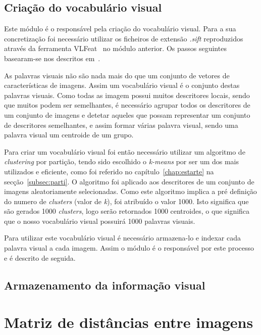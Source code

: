 \subsection{Criação do vocabulário visual}

Este módulo é o responsável pela criação do vocabulário visual. Para a sua concretização foi necessário utilizar os ficheiros de extensão \textit{.sift} reproduzidos através da ferramenta VLFeat~\cite{vedaldi08vlfeat} no módulo anterior. Os passos seguintes basearam-se nos descritos em~\cite{Solem2012}. 

As palavras visuais não são nada mais do que um conjunto de vetores de características de imagens. Assim um vocabulário visual é o conjunto destas palavras visuais. Como todas as imagem possui muitos descritores locais, sendo que muitos podem ser semelhantes, é necessário agrupar todos os descritores de um conjunto de imagens e detetar aqueles que possam representar um conjunto de descritores semelhantes, e assim formar várias palavra visual, sendo uma palavra visual um centroide de um grupo.

Para criar um vocabulário visual foi então necessário utilizar um algoritmo de \textit{clustering} por partição, tendo sido escolhido o \textit{k-means} por ser um dos mais utilizados e eficiente, como foi referido no capítulo~\ref{chap:estarte} na secção~\ref{subsec:parti}. O algoritmo foi aplicado aos descritores de um conjunto de imagens aleatoriamente selecionadas. Como este algoritmo implica a pré definição do numero de \textit{clusters} (valor de \textit{k}), foi atribuído o valor 1000. Isto significa que são gerados 1000 \textit{clusters}, logo serão retornados 1000 centroides, o que significa que o nosso vocabulário visual possuirá 1000 palavras visuais.


Para utilizar este vocabulário visual é necessário armazena-lo e indexar cada palavra visual a cada imagem. Assim o módulo é o responsável por este processo e é descrito de seguida.

\subsection{Armazenamento da informação visual}

\section{Matriz de distâncias entre imagens}